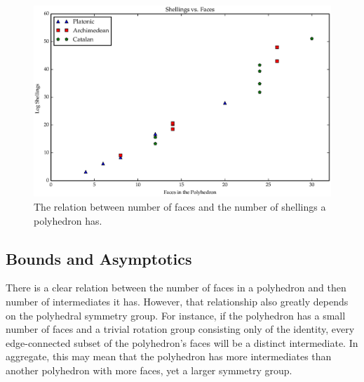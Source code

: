 \begin{figure}[ht]
\includegraphics[scale=0.6, angle=0]{images/polys_face_shellings.eps}
\caption{The relation between number of faces and the number of shellings a polyhedron has.}
\label{fig:FacPathShellings}
\end{figure}

\subsection{Bounds and Asymptotics}
There is a clear relation between the number of faces in a polyhedron and then number of intermediates it has. However, that relationship also greatly depends on the polyhedral symmetry group. For instance, if the polyhedron has a small number of faces and a trivial rotation group consisting only of the identity, every edge-connected subset of the polyhedron's faces will be a distinct intermediate. In aggregate, this may mean that the polyhedron has more intermediates than another polyhedron with more faces, yet a larger symmetry group. 

